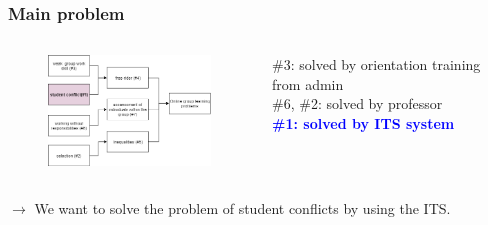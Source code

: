 \documentclass{beamer}
\begin{document}
\begin{frame}
\frametitle{ Main problem}

\begin{columns}
	\begin{column}{.55\textwidth}
	\begin{figure}
		\includegraphics[width=55mm]{p22.png}
	\end{figure}
	\end{column}
\begin{column}{.55\textwidth}
	\#3: solved by orientation training from admin \\
	\#6, \#2: solved by professor\\
	\textcolor{blue}{\textbf{\#1: solved by ITS system}}
\end{column}
\end{columns}
\begin{flushleft}
	
\end{flushleft}



$\rightarrow$	We want to solve the problem of student conflicts by using the ITS. 







\end{frame}
\end{document}
